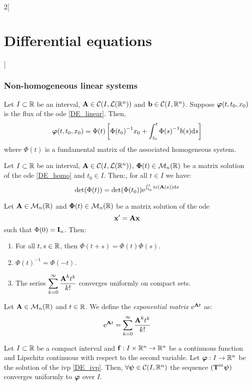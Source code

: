 \documentclass[../../../main.tex]{subfiles}
\begin{document}
\begin{multicols}{2}[\section{Differential equations}]
  \subsubsection{Non-homogeneous linear systems}
  \begin{prop}
    Let $I\subset \mathbb{R}$ be an interval, $\boldsymbol{\mathrm{A}}\in\mathcal{C}(I,\mathcal{L}(\mathbb{R}^n))$ and $\boldsymbol{\mathrm{b}}\in\mathcal{C}(I,\mathbb{R}^n)$. Suppose $\boldsymbol{\mathrm{\varphi}}(t,t_0,x_0)$ is the flux of the ode \eqref{DE_linear}. Then, $$\boldsymbol{\mathrm{\varphi}}(t,t_0,x_0)=\Phi(t)\left[{\Phi(t_0)}^{-1}x_0+\int_{t_0}^t{\Phi(s)}^{-1}b(s)\dd s\right]$$ where $\Phi(t)$ is a fundamental matrix of the associated homogeneous system.
  \end{prop}
  \begin{prop}
    Let $I\subset \mathbb{R}$ be an interval, $\boldsymbol{\mathrm{A}}\in\mathcal{C}(I,\mathcal{L}(\mathbb{R}^n))$, $\boldsymbol{\mathrm{\Phi}}(t)\in\mathcal{M}_n(\mathbb{R})$ be a matrix solution of the ode \eqref{DE_homo} and $t_0\in I$. Then:, for all $t\in I$ we have: $$\det(\Phi(t))=\det (\Phi(t_0))\exp{\int_{t_0}^t\trace(\vectorfunction{A}(s))\dd s}$$
  \end{prop}
  \begin{theorem}
    Let $\boldsymbol{\mathrm{A}}\in\mathcal{M}_n(\mathbb{R})$ and $\boldsymbol{\mathrm{\Phi}}(t)\in\mathcal{M}_n(\mathbb{R})$ be a matrix solution of the ode
    \begin{equation}\label{DE_coef-constants}
      \boldsymbol{\mathrm{x}}'=\boldsymbol{\mathrm{A}}\boldsymbol{\mathrm{x}}
    \end{equation}
    such that $\Phi(0)=\boldsymbol{\mathrm{I}}_n$. Then:
    \begin{enumerate}
      \item For all $t,s\in\mathbb{R}$, then $\Phi(t+s)=\Phi(t)\Phi(s)$.
      \item ${\Phi(t)}^{-1}=\Phi(-t)$.
      \item The series $\displaystyle\sum_{k=0}^\infty \frac{\boldsymbol{\mathrm{A}}^kt^k}{k!}$ converges uniformly on compact sets.
    \end{enumerate}
  \end{theorem}
  \begin{definition}
    Let $\boldsymbol{\mathrm{A}}\in\mathcal{M}_n(\mathbb{R})$ and $t\in\mathbb{R}$. We define the \textit{exponential matrix} $\mathrm{e}^{\boldsymbol{\mathrm{A}}t}$ as: $$\mathrm{e}^{\boldsymbol{\mathrm{A}}t}=\sum_{k=0}^\infty\frac{\boldsymbol{\mathrm{A}}^kt^k}{k!}$$
  \end{definition}
  \begin{lemma}
    Let $I\subset\mathbb{R}$ be a compact interval and $\boldsymbol{\mathrm{f}}:I\times\mathbb{R}^n\rightarrow\mathbb{R}^n$ be a continuous function and Lipschitz continuous with respect to the second variable. Let $\boldsymbol{\mathrm{\varphi}}:I\rightarrow\mathbb{R}^n$ be the solution of the ivp \eqref{DE_ivp}. Then, $\forall\boldsymbol{\mathrm{\psi}}\in\mathcal{C}(I,\mathbb{R}^n)$ the sequence $(\boldsymbol{\mathrm{T}}^m\boldsymbol{\mathrm{\psi}})$ converges uniformly to $\boldsymbol{\mathrm{\varphi}}$ over $I$.

\end{lemma}
\end{multicols}
\end{document}
